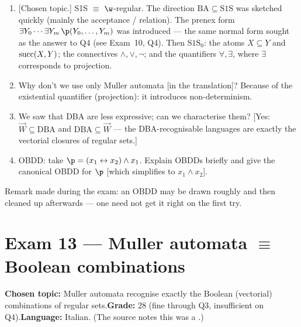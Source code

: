 \documentclass[oneside]{academica}
\begin{document}
\begin{enumerate}
  \item {}[Chosen topic.] S1S $\equiv$ $\w$-regular. The direction
    $\mathrm{BA}\subseteq\mathrm{S1S}$ was sketched quickly (mainly the
    acceptance /  relation). The prenex form $\exists Y_0
    \cdots \exists Y_m\, \p(Y_0,\dots,Y_m)$ was introduced --- the same
    normal form sought as the answer to Q4 
    (see Exam~10, Q4). Then $\text{S1S}_0$: the atoms $X\subseteq Y$ and
    $\text{succ}(X,Y)$; the connectives $\wedge,\vee,\neg$; and the quantifiers
    $\forall,\exists$, where $\exists$ corresponds to projection.
  \item Why don't we use only Muller automata [in the translation]?
    Because of the existential quantifier (projection): it introduces
    non-determinism.
  \item We saw that DBA are less expressive; can we characterise them?
    [Yes: $\overrightarrow{W}\subseteq\mathrm{DBA}$ and
    $\mathrm{DBA}\subseteq\overrightarrow{W}$ --- the DBA-recognisable
    languages are exactly the vectorial closures of regular sets.]
  \item OBDD: take $\p = (x_1 \leftrightarrow x_2)\wedge x_1$. Explain
    OBDDs briefly and give the canonical OBDD for $\p$ [which simplifies
    to $x_1\wedge x_2$].
\end{enumerate}
\begin{note}
  Remark made during the exam: an OBDD may be drawn roughly and then
  cleaned up afterwards --- one need not get it right on the first try.
\end{note}

\section{Exam 13 --- Muller automata \texorpdfstring{$\equiv$}{=} Boolean combinations}
\textbf{Chosen topic:} Muller automata recognise exactly the Boolean
(vectorial) combinations of regular sets.\quad\textbf{Grade:} $28$ (fine
through Q3, insufficient on Q4).\quad\textbf{Language:} Italian.\quad
(The source notes this was a .)
\end{document}
